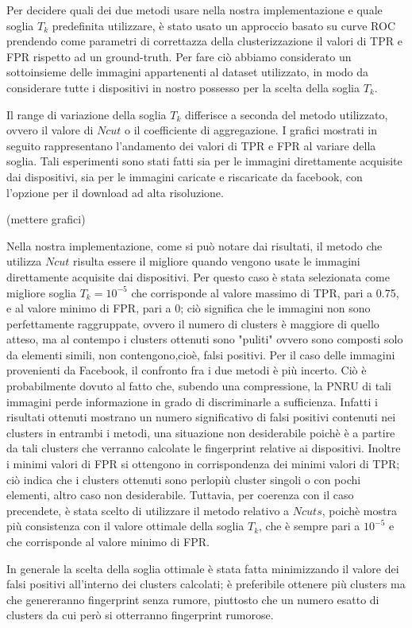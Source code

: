 Per decidere quali dei due metodi usare nella nostra implementazione e quale soglia $T_{k}$ predefinita utilizzare, è stato usato un approccio basato su curve ROC prendendo come parametri di correttazza della clusterizzazione il valori di TPR e FPR rispetto ad un ground-truth. Per fare ciò abbiamo considerato un sottoinsieme delle immagini appartenenti al dataset utilizzato, in modo da considerare tutte i dispositivi in nostro possesso per la scelta della soglia $T_{k}$.

Il range di variazione della soglia $T_{k}$ differisce a seconda del metodo utilizzato, ovvero il valore di $Ncut$ o il coefficiente di aggregazione. I grafici mostrati in seguito rappresentano l'andamento dei valori di TPR e FPR al variare della soglia. Tali esperimenti sono stati fatti sia per le immagini direttamente acquisite dai dispositivi, sia per le immagini caricate e riscaricate da facebook, con l'opzione per il download ad alta risoluzione.


(mettere grafici)


Nella nostra implementazione, come si può notare dai risultati, il metodo che utilizza $Ncut$ risulta essere il migliore quando vengono usate le immagini direttamente acquisite dai dispositivi. Per questo caso è stata selezionata come migliore soglia $T_{k} = 10^{-5}$ che corrisponde al valore massimo di TPR, pari a 0.75, e al valore minimo di FPR, pari a 0; ciò significa che le immagini non sono perfettamente raggruppate, ovvero il numero di clusters è maggiore di quello atteso, ma al contempo i clusters ottenuti sono "puliti" ovvero sono composti solo da elementi simili, non contengono,cioè, falsi positivi.
Per il caso delle immagini provenienti da Facebook, il confronto fra i due metodi è più incerto. Ciò è probabilmente dovuto al fatto che, subendo una compressione, la PNRU di tali immagini perde informazione in grado di discriminarle a sufficienza. Infatti i risultati ottenuti mostrano un numero significativo di falsi positivi contenuti nei clusters in entrambi i metodi, una situazione non desiderabile poichè è a partire da tali clusters che verranno calcolate le fingerprint relative ai dispositivi. Inoltre i minimi valori di FPR si ottengono in corrispondenza dei minimi valori di TPR; ciò indica che i clusters ottenuti sono perlopiù cluster singoli o con pochi elementi, altro caso non desiderabile. Tuttavia, per coerenza con il caso precendete, è stata scelto di utilizzare il metodo relativo a $Ncuts$, poichè mostra più consistenza con il valore ottimale della soglia $T_{k}$, che è sempre pari a $10^{-5}$ e che corrisponde al valore minimo di FPR.

In generale la scelta della soglia ottimale è stata fatta minimizzando il valore dei falsi positivi all'interno dei clusters calcolati; è preferibile ottenere più clusters ma che genereranno fingerprint senza rumore, piuttosto che un numero esatto di clusters da cui però si otterranno fingerprint rumorose.
